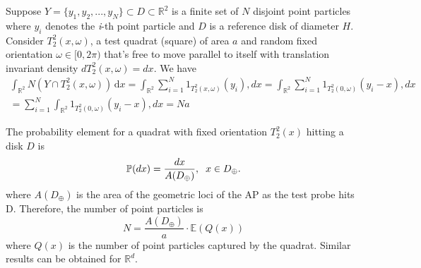 Suppose $Y=\{ y_1,y_2,...,y_N \}\subset D \subset \mathbb{R}^2$ is a finite set of $N$ disjoint point particles where $y_i$ denotes the \textit{i}-th point particle and $D$ is a reference disk of diameter $H$. Consider $T_2^2(x,\omega)$, a test quadrat (square) of area $a$ and random fixed orientation $\omega \in [0,2\pi)$ that's free to move parallel to itself with translation invariant density $dT_2^2(x,\omega)=dx$. We have
\begin{multline} \label{eq3}
    \int_{\mathbb{R}^2}  N(Y\cap T_2^2(x,\omega))\,\mathrm{d}x = \int_{\mathbb{R}^2} \sum_{i=1}^N 1_{T_2^2(x,\omega)}(y_i),dx = \int_{\mathbb{R}^2} \sum_{i=1}^N 1_{T_2^2(0,\omega)}(y_i-x),dx \\ = \sum_{i=1}^N \int_{\mathbb{R}^2}  1_{T_2^2(0,\omega)}(y_i-x),dx = Na 
\end{multline}

The probability element for a quadrat with fixed orientation $T_2^2(x)$ hitting a disk $D$ is
\begin{equation*}
    \mathbb{P}(dx)=\frac{dx}{A(D_{\oplus})}, \hspace{2mm} x\in D_{\oplus}.
\end{equation*}
where $A(D_{\oplus})$ is the area of the geometric loci of the AP as the test probe hits D. Therefore, the number of point particles is
\begin{equation*}
    N=\frac{A(D_{\oplus})}{a}\cdot\mathbb{E}(Q(x))
\end{equation*}
where $Q(x)$ is the number of point particles captured by the quadrat. Similar results can be obtained for $\mathbb{R}^d$.\\

